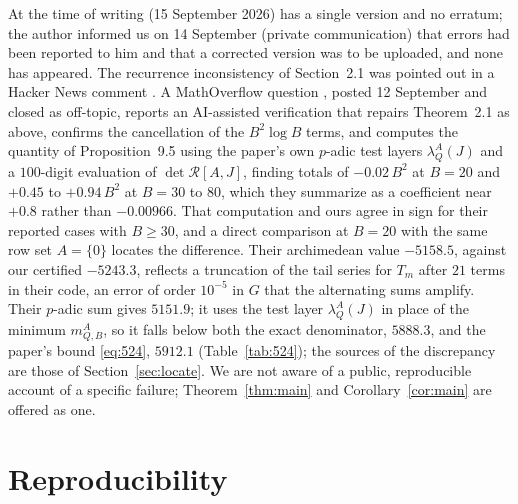 \documentclass[11pt]{amsart}
\theoremstyle{definition}
\begin{document}
At the time of writing (15 September 2026) \cite{Sun26} has a single version and no erratum; the author informed
us on 14 September (private communication) that errors had been reported to him and that a corrected version
was to be uploaded, and none has appeared. The recurrence
inconsistency of Section~2.1 was pointed out in a Hacker News comment \cite{HN26}. A MathOverflow question
\cite{MO26}, posted 12 September and closed as off-topic, reports an AI-assisted verification that repairs
Theorem~2.1 as above, confirms the cancellation of the $B^2\log B$ terms, and computes the quantity of
Proposition~9.5 using the paper's own $p$-adic test layers $\lambda^A_Q(J)$ and a $100$-digit evaluation of
$\det\mathcal R[A,J]$, finding totals of $-0.02\,B^2$ at $B=20$ and $+0.45$ to $+0.94\,B^2$ at $B=30$ to $80$, which they summarize as a coefficient near $+0.8$ rather than $-0.00966$. That computation and ours agree in sign for their reported cases with $B\ge30$, and a direct comparison at $B=20$ with the same row set $A=\{0\}$ locates the difference. Their archimedean value $-5158.5$, against our certified $-5243.3$, reflects a truncation of the tail series for $T_m$ after $21$ terms in their code, an error of order $10^{-5}$ in $G$ that the alternating sums amplify. Their $p$-adic sum gives $5151.9$; it uses the test layer $\lambda^A_Q(J)$ in place of the minimum $m^A_{Q,B}$, so it falls below both the exact denominator, $5888.3$, and the paper's bound \eqref{eq:524}, $5912.1$ (Table~\ref{tab:524}); the sources of the discrepancy are those of Section~\ref{sec:locate}. We are not aware of a public, reproducible account of a specific failure; Theorem~\ref{thm:main} and Corollary~\ref{cor:main} are offered as one.

\section{Reproducibility}\label{sec:repro}
\end{document}
